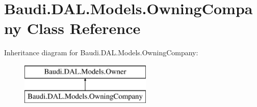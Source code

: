 \hypertarget{class_baudi_1_1_d_a_l_1_1_models_1_1_owning_company}{}\section{Baudi.\+D\+A\+L.\+Models.\+Owning\+Company Class Reference}
\label{class_baudi_1_1_d_a_l_1_1_models_1_1_owning_company}
Inheritance diagram for Baudi.\+D\+A\+L.\+Models.\+Owning\+Company\+:\begin{figure}[H]
\begin{center}
\leavevmode
\includegraphics[height=2.000000cm]{class_baudi_1_1_d_a_l_1_1_models_1_1_owning_company}
\end{center}
\end{figure}
